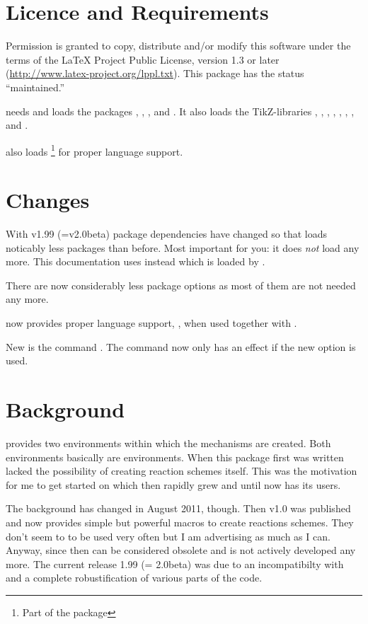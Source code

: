 \documentclass[toc=index,DIV10]{cnpkgdoc}
\begin{document}
\section{Licence and Requirements}\label{ssec:voraussetzungen}
Permission is granted to copy, distribute and/or modify this software under the
terms of the LaTeX Project Public License, version 1.3 or later
(\url{http://www.latex-project.org/lppl.txt}). This package has the status
``maintained.''

\mychemistry needs and loads the packages , ,
,  and . It also loads the 
TikZ-libraries , , ,
, , , ,  and
.

\mychemistry also loads \footnote{Part of the
 package} for proper language support.

\section{Changes}
With v1.99 (=v2.0beta) package dependencies have changed so that \mychemistry
loads noticably less packages than before. Most important for you: it does \emph{not}
load  any more. This documentation uses  instead
which is loaded by \mychemistry.

There are now considerably less package options as most of them are not needed
any more.

\mychemistry now provides proper language support, \eg, when used together with
.

New is the command . The command  now only has
an effect if the new option  is used.

\section{Background}
\mychemistry provides two environments within which the mechanisms are created.
Both environments basically are  environments. When this package
first was written  lacked the possibility of creating reaction
schemes itself. This was the motivation for me to get started on \mychemistry
which then rapidly grew and until now has its users.

The background has changed in August 2011, though. Then  v1.0 was
published and now provides simple but powerful macros to create reactions schemes.
They don't seem to to be used very often but I am advertising as much as I can.
Anyway, since then \mychemistry can be considered obsolete and is not actively
developed any more. The current release 1.99 (= 2.0beta) was due to an
incompatibilty with  and a complete robustification of various
parts of the code.
\end{document}
